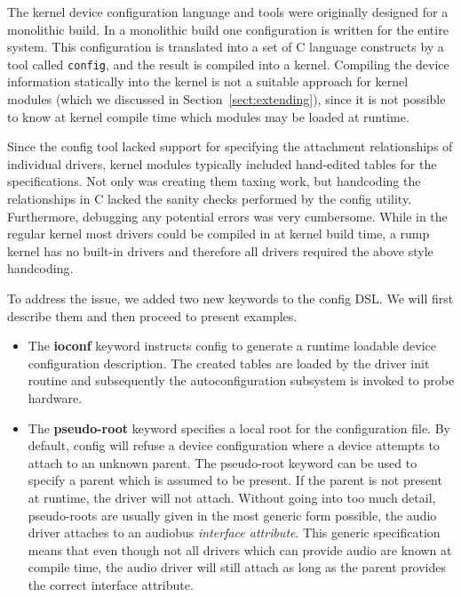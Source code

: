 The kernel device configuration language and tools were originally
designed for a monolithic build.  In a monolithic build one configuration
is written for the entire system.  This configuration is translated
into a set of C language constructs by a tool called \texttt{config},
and the result is compiled into a kernel.  Compiling the device information
statically into the kernel is not a suitable approach for kernel
modules (which we discussed in Section~\ref{sect:extending}), since it is
not possible to know at kernel compile time which modules may be loaded
at runtime.

Since the config tool lacked support for specifying the attachment
relationships of individual drivers, kernel modules typically
included hand-edited tables for the specifications.  Not only was
creating them taxing work, but handcoding the relationships in C
lacked the sanity checks performed by the config utility.  Furthermore,
debugging any potential errors was very cumbersome.  While in the
regular kernel most drivers could be compiled in at kernel build
time, a rump kernel has no built-in drivers and therefore all
drivers required the above style handcoding.

To address the issue, we added two new keywords to the config DSL.
We will first describe them and then proceed to present examples.

\begin{itemize}
\item   The \textbf{ioconf} keyword instructs config to generate
	a runtime loadable device configuration description.  The
	created tables are loaded by the driver init routine and
	subsequently the autoconfiguration subsystem is invoked to
	probe hardware.

\item   The \textbf{pseudo-root} keyword specifies a local root
	for the configuration file.  By default, config will refuse
	a device configuration where a device attempts to attach
	to an unknown parent.  The pseudo-root keyword can be used
	to specify a parent which is assumed to be present.  If
	the parent is not present at runtime, the driver will not
	attach.  Without going into too much detail, pseudo-roots
	are usually given in the most generic form possible, \eg
	the audio driver attaches to an audiobus \textit{interface
	attribute}.  This generic specification means that even though
	not all drivers which can provide audio are known at compile
	time, the audio driver will still attach as long as the parent
	provides the correct interface attribute.
\end{itemize}

